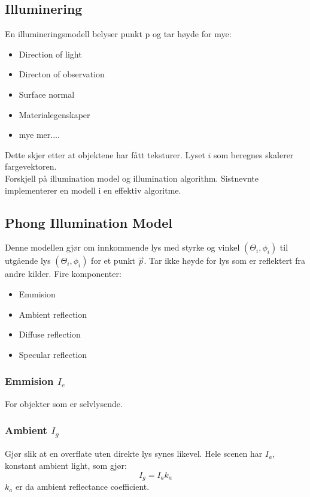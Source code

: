 \subsection{Illuminering}
En illumineringsmodell belyser punkt p og tar høyde for mye:
\begin{itemize}
    \item Direction of light
    \item Directon of observation
    \item Surface normal
    \item Materialegenskaper
    \item mye mer....
\end{itemize}
Dette skjer etter at objektene har fått teksturer. Lyset $i$ som beregnes skalerer fargevektoren. \\
Forskjell på illumination model og illumination algorithm. Sistnevnte implementerer en modell i en effektiv algoritme.

\subsection{Phong Illumination Model}
Denne modellen gjør om innkommende lys med styrke og vinkel $(\Theta_i, \phi_i)$ til utgående lys $(\Theta_i, \phi_i)$ for et punkt $\vec{p}$. Tar ikke høyde for lys som er reflektert fra andre kilder. Fire komponenter:

\begin{itemize}
    \item Emmision
    \item Ambient reflection
    \item Diffuse reflection
    \item Specular reflection
\end{itemize}

\subsubsection{Emmision $I_e$}
For objekter som er selvlysende.

\subsubsection{Ambient $I_g$}
Gjør slik at en overflate uten direkte lys synes likevel. Hele scenen har $I_a$, konstant ambient light, som gjør:
\begin{equation}
    I_g = I_ak_a
\end{equation}
$k_a$ er da ambient reflectance coefficient.

